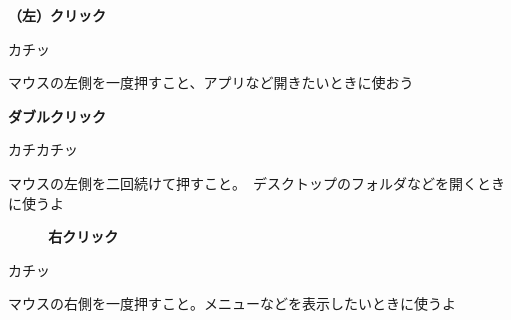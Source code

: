 \documentclass[a4paper,12pt]{jarticle}
\begin{document}
	\begin{minipage}{\textwidth}
\begin{minipage}{5.562cm}
	\centering
\textbf{（左）クリック}
\flushleft

	カチッ\\
	\centering
{}

\flushleft
マウスの左側を一度押すこと、アプリなど開きたいときに使おう
\end{minipage}
\begin{minipage}{5.562cm}
	\centering
\textbf{ダブルクリック}
\flushleft

	カチカチッ\\
\centering
{}


\flushleft
マウスの左側を二回続けて押すこと。　デスクトップのフォルダなどを開くときに使うよ
\end{minipage}
\begin{minipage}{5.562cm}
	\centering
\textbf{~~~~~右クリック}
\flushleft

	\hspace{3cm} カチッ\\
	\centering
{}


\flushleft
マウスの右側を一度押すこと。メニューなどを表示したいときに使うよ
\end{minipage}
\end{minipage}
\end{document}
